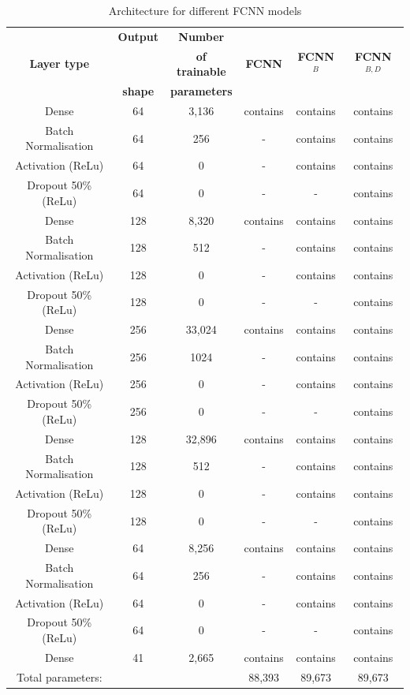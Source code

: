 \documentclass[aerospace,article,submit,moreauthors,pdftex]{Definitions/mdpi}
\begin{document}
\begin{table}[]
    \caption{Architecture for different FCNN models}
    \centering
    \begin{tabular}{c c c c c c}
    \toprule
	& \textbf{Output}	& \textbf{Number } & &  & \\
    \textbf{Layer type}	& 	& \textbf{of trainable } & \textbf{FCNN} & \textbf{FCNN$^B$} & \textbf{FCNN$^{B,D}$}\\
   	& \textbf{shape}	& \textbf{parameters} &  &  & \\
	\midrule
        Dense                       & 64 & 3,136 & contains & contains & contains\\
        Batch Normalisation         & 64 & 256 & - & contains & contains\\
        Activation (ReLu)           & 64 & 0 & - & contains & contains\\
        Dropout 50\% (ReLu)         & 64 & 0 & - & - & contains\\
        Dense                       & 128 & 8,320  & contains & contains & contains\\
        Batch Normalisation         & 128 & 512 & - & contains & contains\\
        Activation (ReLu)           & 128 & 0 & - & contains & contains\\
        Dropout 50\% (ReLu)         & 128 & 0 & - & - & contains\\
        Dense                       & 256 & 33,024 & contains & contains & contains\\
        Batch Normalisation         & 256 & 1024 & - & contains & contains\\
        Activation (ReLu)           & 256 & 0 & - & contains & contains\\
        Dropout 50\% (ReLu)         & 256 & 0 & - & - & contains\\
        Dense                       & 128 & 32,896 & contains & contains & contains\\
        Batch Normalisation         & 128 & 512 & - & contains & contains\\
        Activation (ReLu)           & 128 & 0 & - & contains & contains\\
        Dropout 50\% (ReLu)         & 128 & 0 & - & - & contains\\
        Dense                       & 64 & 8,256 & contains & contains & contains\\
        Batch Normalisation         & 64 & 256 & - & contains & contains\\
        Activation (ReLu)           & 64 & 0 & - & contains & contains\\
        Dropout 50\% (ReLu)         & 64 & 0 & - & - & contains\\
        Dense                       & 41 & 2,665 & contains & contains & contains\\
        \midrule
        Total parameters: & & & 88,393 & 89,673 & 89,673
    \end{tabular}
    \label{tab:FCNN}
\end{table}
\end{document}
